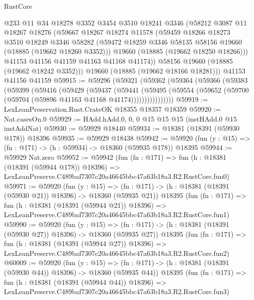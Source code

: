 \begin{lexlean}{RustCore}
\begin{coremodule}
        @233
        @11
        @34
        @18278
        @3352
        @3454
        @3510
        @18241
        @3346
        (@58212
          @3087
          @11
          @18267
          @18276
          (@59667
            @18267
            @18274
            @11578
            (@59459
              @18266
              @18273
              @3510
              @18249
              @3346
              @58282
              (@59472 @18259 @3346 @58135 @58156 @19660 (@18885 (@19662 @18260 @3352)))
              @19660
              (@18885 (@19662 @18250 @18266)))
            @41153
            @41156
            @41159
            @41163
            @41168
            @41174))
        @58156
        @19660
        (@18885 (@19662 @18242 @3352)))
      @19660
      (@18885 (@19662 @18166 @18281)))
    @41153
    @41156
    @41159
@59915 := @59296
    (@59321
      (@59362
        (@59364
          (@59366
            (@59383
              (@59399
                (@59416
                  (@59429
                    (@59437
                      (@59441
                        (@59495
                          (@59554
                            (@59652 (@59700 (@59704 (@59896 @41163 @41168 @41174))))))))))))))))
@59919 := LexLeanPreservation.Rust.CrateOK @18355 @18357 @18359
@59920 := Nat.casesOn.{0}
@59929 := HAdd.hAdd.{0, 0, 0} @15 @15 @15 (instHAdd.{0} @15 instAddNat)
@59930 := @59929 @18440
@59934 := @18381 (@18391 (@59930 @178)) @18396
@59935 := @59929 @18438
@59942 := @59920 (fun (y : @15) => (fn : @171) -> (h : @59934) -> @18360 (@59935 @178)) @18395
@59944 := @59929 Nat.zero
@59952 := @59942
    (fun (fn : @171) =>
    fun (h : @18381 (@18391 (@59944 @178)) @18396) =>
    LexLeanPreserve.C489baf7307c20a46645bbc47a63b18a3.R2.RustCore.fun0)
@59971 := @59920
    (fun (y : @15) =>
    (fn : @171) -> (h : @18381 (@18391 (@59930 @21)) @18396) -> @18360 (@59935 @21))
    @18395
    (fun (fn : @171) =>
    fun (h : @18381 (@18391 (@59944 @21)) @18396) =>
    LexLeanPreserve.C489baf7307c20a46645bbc47a63b18a3.R2.RustCore.fun1)
@59990 := @59920
    (fun (y : @15) =>
    (fn : @171) -> (h : @18381 (@18391 (@59930 @27)) @18396) -> @18360 (@59935 @27))
    @18395
    (fun (fn : @171) =>
    fun (h : @18381 (@18391 (@59944 @27)) @18396) =>
    LexLeanPreserve.C489baf7307c20a46645bbc47a63b18a3.R2.RustCore.fun2)
@60009 := @59920
    (fun (y : @15) =>
    (fn : @171) -> (h : @18381 (@18391 (@59930 @44)) @18396) -> @18360 (@59935 @44))
    @18395
    (fun (fn : @171) =>
    fun (h : @18381 (@18391 (@59944 @44)) @18396) =>
    LexLeanPreserve.C489baf7307c20a46645bbc47a63b18a3.R2.RustCore.fun3)

\end{coremodule}
\end{lexlean}
